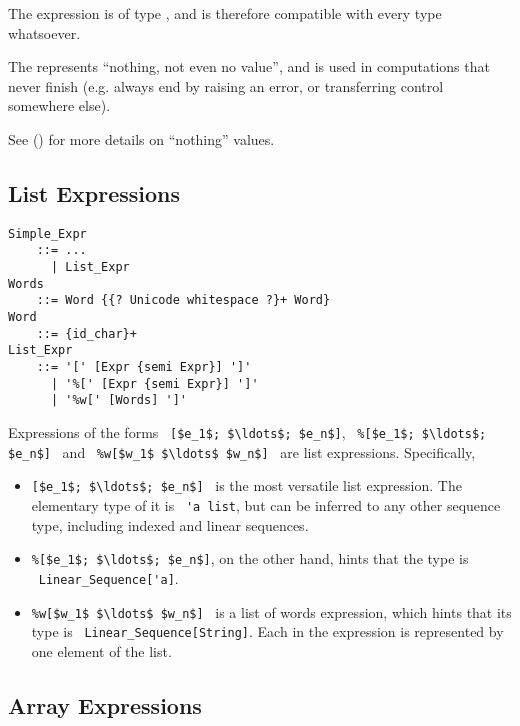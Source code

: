 The  expression is of type , and is therefore compatible with every type whatsoever. 

The  represents ``nothing, not even no value'', and is used in computations that never finish (e.g. always end by raising an error, or transferring control somewhere else).

See () for more details on ``nothing'' values. 





\subsection{List Expressions}
\label{sec:list-expressions}

\grammar\begin{lstlisting}
Simple_Expr 
    ::= ...
      | List_Expr
Words
    ::= Word {{? Unicode whitespace ?}+ Word}
Word
    ::= {id_char}+
List_Expr
    ::= '[' [Expr {semi Expr}] ']'
      | '%[' [Expr {semi Expr}] ']'
      | '%w[' [Words] ']'
\end{lstlisting}

Expressions of the forms ~\lstinline![$e_1$; $\ldots$; $e_n$]!, ~\lstinline!%[$e_1$; $\ldots$; $e_n$]!~ and ~\lstinline!%w[$w_1$ $\ldots$ $w_n$]!~ are list expressions. Specifically, 
\begin{itemize}
  \item \lstinline![$e_1$; $\ldots$; $e_n$]!~ is the most versatile list expression. The elementary type of it is ~\lstinline!'a list!, but can be inferred to any other sequence type, including indexed and linear sequences. 
  \item \lstinline!%[$e_1$; $\ldots$; $e_n$]!, on the other hand, hints that the type is ~\lstinline!Linear_Sequence['a]!.
  \item \lstinline!%w[$w_1$ $\ldots$ $w_n$]!~ is a list of words expression, which hints that its type is ~\lstinline!Linear_Sequence[String]!. Each  in the expression is represented by one  element of the list. 
\end{itemize}






\subsection{Array Expressions}
\label{sec:array-expressions}

